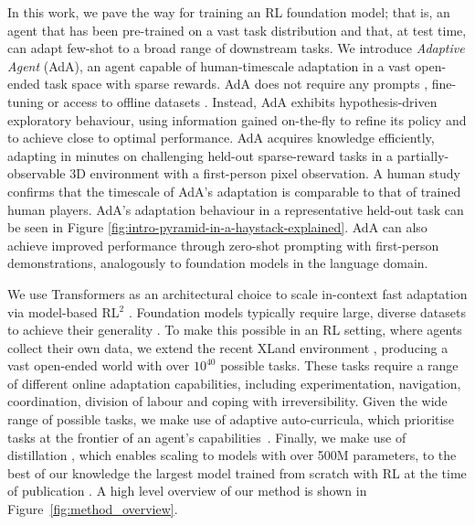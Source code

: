 In this work, we pave the way for training an RL foundation model; that is, an agent that has been pre-trained on a vast task distribution and that, at test time, can adapt few-shot to a broad range of downstream tasks. We introduce \emph{Adaptive Agent} (AdA), an agent capable of human-timescale adaptation in a vast open-ended task space with sparse rewards. AdA does not require any prompts \citep{reed2022a}, fine-tuning \citep{lee2022multigame} or access to offline datasets \citep{laskin2022algorithmdistillation, reed2022a}. Instead, AdA exhibits hypothesis-driven exploratory behaviour, using information gained on-the-fly to refine its policy and to achieve close to optimal performance. AdA acquires knowledge efficiently, adapting in minutes on challenging held-out sparse-reward tasks in a partially-observable 3D environment with a first-person pixel observation. A human study confirms that the timescale of AdA's adaptation is comparable to that of trained human players. AdA's adaptation behaviour in a representative held-out task can be seen in Figure \ref{fig:intro-pyramid-in-a-haystack-explained}. AdA can also achieve improved performance through zero-shot prompting with first-person demonstrations, analogously to foundation models in the language domain.

We use Transformers as an architectural choice to scale in-context fast adaptation via model-based RL${^2}$ \citep{duan2017rl, wang2016learning, melo2022transformers}. Foundation models typically require large, diverse datasets to achieve their generality \citep{8237359, mahajan2018, brown2020gpt3, 9880094, schuhmann2022laionb}. To make this possible in an RL setting, where agents collect their own data, we extend the recent XLand environment \citep{xland}, producing a vast open-ended world with over $10^{40}$ possible tasks. These tasks require a range of different online adaptation capabilities, including experimentation, navigation, coordination, division of labour and coping with irreversibility. Given the wide range of possible tasks, we make use of adaptive auto-curricula, which prioritise tasks at the frontier of an agent's capabilities~\citep{xland, jiang2021robustplr}. Finally, we make use of distillation \citep{schmitt2018kickstarting}, which enables scaling to models with over 500M parameters, to the best of our knowledge the largest model trained from scratch with RL at the time of publication \citep{https://doi.org/10.48550/arxiv.2102.07920}. A high level overview of our method is shown in Figure~\ref{fig:method_overview}. 


